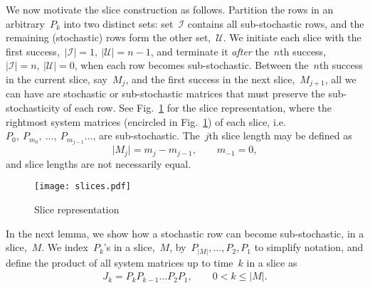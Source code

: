 \documentclass[draftclsnofoot, onecolumn, 12pt]{IEEEtran}
\begin{document}
We now motivate the slice construction as follows. Partition the rows in an arbitrary~$P_k$ into two distinct sets: set~$\mathcal{I}$ contains all sub-stochastic rows, and the remaining (stochastic) rows form the other set,~$\mathcal{U}$. We initiate each slice with the first success,~$\vert \mathcal{I} \vert=1,~\vert \mathcal{U} \vert=n-1$, and terminate it \textit{after} the~$n$th success,~$\vert \mathcal{I} \vert=n,~\vert \mathcal{U} \vert=0$, when each row becomes sub-stochastic. Between the~$n$th success in the current slice, say~$M_j$, and the first success in the next slice,~$M_{j+1}$, all we can have are stochastic or sub-stochastic matrices that must preserve the sub-stochasticity of each row. See Fig.~\ref{f0} for the slice representation, where the rightmost system matrices (encircled in Fig.~\ref{f0}) of each slice, i.e.~${P}_0,~{P}_{m_0},~\ldots,~{P}_{m_{j-1}} \ldots$, are sub-stochastic. The~$j$th slice length may be defined as
\begin{equation*}
\vert {M}_{j} \vert = m_j - m_{j-1},\qquad m_{-1}=0,
\end{equation*}
and slice lengths are not necessarily equal. 
\begin{figure}[!h]
\centering
\texttt{[image: slices.pdf]}
\caption{Slice representation}
\label{f0}
\end{figure}

In the next lemma, we show how a stochastic row can become sub-stochastic, in a slice,~${{M}}$. We index~$P_k$'s in a slice,~$M$, by~$P_{\vert {M} \vert}, \ldots, P_2, P_1$ to simplify notation, and define the product of all system matrices up to time~$k$ in a slice as
\begin{eqnarray}\label{14}
J_k=P_k P_{k-1} \ldots P_2 P_1, \qquad 0 < k \leq |{{M}}|.
\end{eqnarray}
\end{document}
